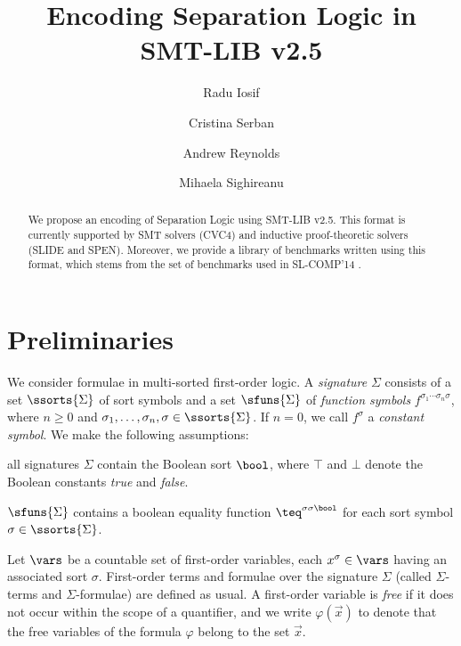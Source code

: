 \documentclass[10pt]{llncs}
\begin{document}

\sloppy
\title{Encoding Separation Logic in SMT-LIB v2.5}

\author{Radu Iosif \and Cristina Serban \and Andrew Reynolds \and Mihaela Sighireanu} 


\maketitle

\begin{abstract}
  We propose an encoding of Separation Logic using SMT-LIB v2.5. This
  format is currently supported by SMT solvers (CVC4) and inductive
  proof-theoretic solvers (SLIDE and SPEN). Moreover, we provide a
  library of benchmarks written using this format, which stems from
  the set of benchmarks used in SL-COMP'14 \cite{sl-comp14}.
\end{abstract}

\section{Preliminaries}

We consider formulae in multi-sorted first-order logic.  A
\emph{signature} $\Sigma$ consists of a set $\ssorts{\Sigma}$ of sort
symbols and a set $\sfuns{\Sigma}$ of \emph{function symbols}
$f^{\sigma_1 \cdots \sigma_n \sigma}$, where $n \geq 0$ and $\sigma_1,
\ldots, \sigma_n, \sigma \in \ssorts{\Sigma}$. If $n=0$, we call
$f^\sigma$ a \emph{constant symbol}. We make the following
assumptions:
\begin{compactenum}
\item all signatures $\Sigma$ contain the Boolean sort $\bool$, where
  $\top$ and $\bot$ denote the Boolean constants \emph{true} and
  \emph{false}. 
\item $\sfuns{\Sigma}$ contains a boolean equality function
  $\teq^{\sigma\sigma\bool}$ for each sort symbol
  $\sigma\in\ssorts{\Sigma}$.
\end{compactenum}

Let $\vars$ be a countable set of first-order variables, each
$x^\sigma \in \vars$ having an associated sort $\sigma$. First-order
terms and formulae over the signature $\Sigma$ (called $\Sigma$-terms
and $\Sigma$-formulae) are defined as usual. A first-order variable is
\emph{free} if it does not occur within the scope of a quantifier, and
we write $\varphi(\vec{x})$ to denote that the free variables of the
formula $\varphi$ belong to the set $\vec{x}$. 
\end{document}
